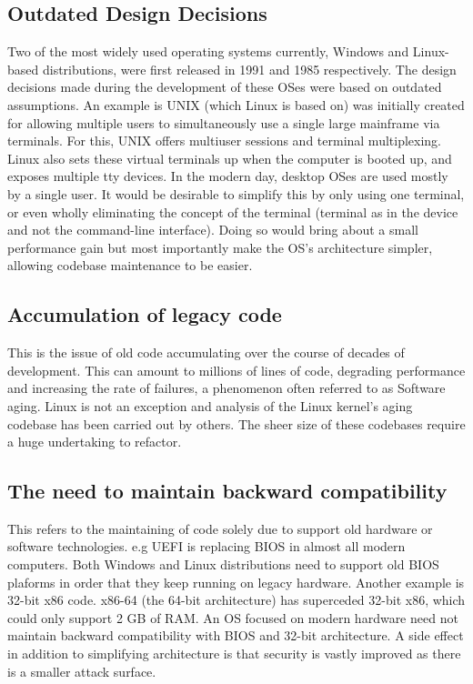 \documentclass[conference]{IEEEtran}
\begin{document}
\subsection{Outdated Design Decisions}
Two of the most widely used operating systems currently, Windows and Linux-based distributions, were first released in 1991 and 1985 respectively.
The design decisions made during the development of these OSes were based on outdated assumptions.
An example is UNIX (which Linux is based on) was initially created for allowing multiple users to simultaneously use a single large mainframe via terminals.
For this, UNIX offers multiuser sessions and terminal multiplexing.
Linux also sets these virtual terminals up when the computer is booted up, and exposes multiple tty devices.
In the modern day, desktop OSes are used mostly by a single user.
It would be desirable to simplify this by only using one terminal, or even wholly eliminating the concept of the terminal (terminal as in the device and not the command-line interface).
Doing so would bring about a small performance gain but most importantly make the OS's architecture simpler, allowing codebase maintenance to be easier.

\subsection{Accumulation of legacy code}

This is the issue of old code accumulating over the course of decades of development.
This can amount to millions of lines of code, degrading performance and increasing the rate of failures, a phenomenon often referred to as Software aging.
Linux is not an exception and analysis of the Linux kernel's aging codebase has been carried out by others. \cite{linuxaging, linuxaging2}
The sheer size of these codebases require a huge undertaking to refactor.

\subsection{The need to maintain backward compatibility}

This refers to the maintaining of code solely due to support old hardware or software technologies. e.g UEFI is replacing BIOS in almost all modern computers. Both Windows and Linux distributions need to support old BIOS plaforms in order that they keep running on legacy hardware. Another example is 32-bit x86 code. x86-64 (the 64-bit architecture) has superceded 32-bit x86, which could only support 2 GB of RAM. An OS focused on modern hardware need not maintain backward compatibility with BIOS and 32-bit architecture. A side effect in addition to simplifying architecture is that security is vastly improved as there is a smaller attack surface.
\end{document}
